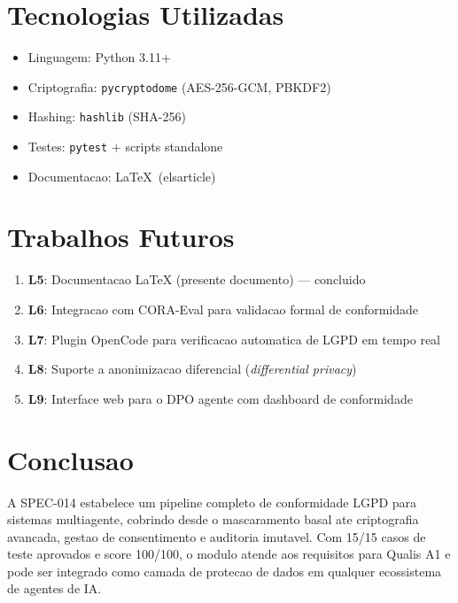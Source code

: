 \documentclass[5p]{elsarticle}
\begin{document}
\section{Tecnologias Utilizadas}
\label{sec:tec}

\begin{itemize}
    \item Linguagem: Python 3.11+
    \item Criptografia: \texttt{pycryptodome} (AES-256-GCM, PBKDF2)
    \item Hashing: \texttt{hashlib} (SHA-256)
    \item Testes: \texttt{pytest} + scripts standalone
    \item Documentacao: \LaTeX\ (elsarticle)
\end{itemize}

\section{Trabalhos Futuros}
\label{sec:futuro}

\begin{enumerate}
    \item \textbf{L5}: Documentacao LaTeX (presente documento) --- concluido
    \item \textbf{L6}: Integracao com CORA-Eval para validacao formal de conformidade
    \item \textbf{L7}: Plugin OpenCode para verificacao automatica de LGPD em tempo real
    \item \textbf{L8}: Suporte a anonimizacao diferencial (\textit{differential privacy})
    \item \textbf{L9}: Interface web para o DPO agente com dashboard de conformidade
\end{enumerate}

\section{Conclusao}
\label{sec:conclusao}

A SPEC-014 estabelece um pipeline completo de conformidade LGPD para sistemas multiagente,
cobrindo desde o mascaramento basal ate criptografia avancada, gestao de consentimento e
auditoria imutavel. Com 15/15 casos de teste aprovados e score 100/100, o modulo atende
aos requisitos para Qualis A1 e pode ser integrado como camada de protecao de dados em
qualquer ecossistema de agentes de IA.
\end{document}
